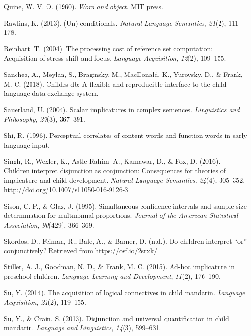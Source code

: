 \documentclass[oneside]{report}
\theoremstyle{definition}
\theoremstyle{definition}
\theoremstyle{definition}
\theoremstyle{remark}
\begin{document}
\hypertarget{ref-quine1960word}{}
Quine, W. V. O. (1960). \emph{Word and object}. MIT press.

\hypertarget{ref-rawlins2013conditionals}{}
Rawlins, K. (2013). (Un) conditionals. \emph{Natural Language
Semantics}, \emph{21}(2), 111--178.

\hypertarget{ref-reinhart2004processing}{}
Reinhart, T. (2004). The processing cost of reference set computation:
Acquisition of stress shift and focus. \emph{Language Acquisition},
\emph{12}(2), 109--155.

\hypertarget{ref-sanchez2018childes}{}
Sanchez, A., Meylan, S., Braginsky, M., MacDonald, K., Yurovsky, D., \&
Frank, M. C. (2018). Childes-db: A flexible and reproducible interface
to the child language data exchange system.

\hypertarget{ref-sauerland2004scalar}{}
Sauerland, U. (2004). Scalar implicatures in complex sentences.
\emph{Linguistics and Philosophy}, \emph{27}(3), 367--391.

\hypertarget{ref-shi1996perceptual}{}
Shi, R. (1996). Perceptual correlates of content words and function
words in early language input.

\hypertarget{ref-Singh2016}{}
Singh, R., Wexler, K., Astle-Rahim, A., Kamawar, D., \& Fox, D. (2016).
Children interpret disjunction as conjunction: Consequences for theories
of implicature and child development. \emph{Natural Language Semantics},
\emph{24}(4), 305--352. \url{http://doi.org/10.1007/s11050-016-9126-3}

\hypertarget{ref-sison1995simultaneous}{}
Sison, C. P., \& Glaz, J. (1995). Simultaneous confidence intervals and
sample size determination for multinomial proportions. \emph{Journal of
the American Statistical Association}, \emph{90}(429), 366--369.

\hypertarget{ref-skordosEtal2018}{}
Skordos, D., Feiman, R., Bale, A., \& Barner, D. (n.d.). Do children
interpret ``or'' conjunctively? Retrieved from
\url{https://osf.io/2srxk/}

\hypertarget{ref-stiller2015ad}{}
Stiller, A. J., Goodman, N. D., \& Frank, M. C. (2015). Ad-hoc
implicature in preschool children. \emph{Language Learning and
Development}, \emph{11}(2), 176--190.

\hypertarget{ref-su2014acquisition}{}
Su, Y. (2014). The acquisition of logical connectives in child mandarin.
\emph{Language Acquisition}, \emph{21}(2), 119--155.

\hypertarget{ref-su2013disjunction}{}
Su, Y., \& Crain, S. (2013). Disjunction and universal quantification in
child mandarin. \emph{Language and Linguistics}, \emph{14}(3), 599--631.
\end{document}
